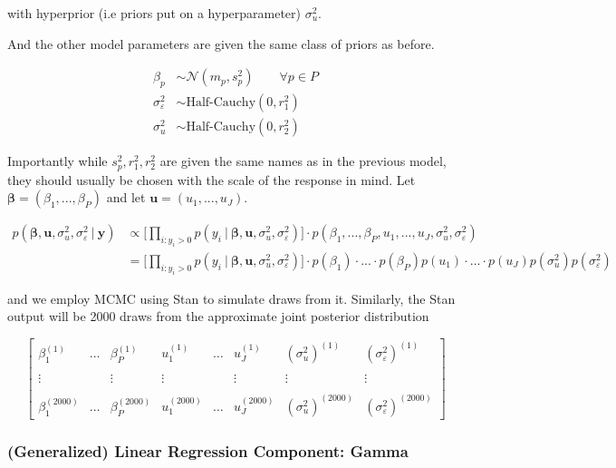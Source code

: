 \documentclass[12pt,twoside]{reedthesis}
\begin{document}
with hyperprior (i.e priors put on a hyperparameter) \(\sigma_{u}^2\).

And the other model parameters are given the same class of priors as before.

\[
\begin{aligned}
\beta_p &\sim \mathcal{N}(m_p, s_p^2)  \qquad \forall p\in P \\
\sigma_{\varepsilon}^2 &\sim \text{Half-Cauchy}(0, r_1^2) \\
\sigma_{u}^2 &\sim \text{Half-Cauchy}(0, r_2^2)
\end{aligned}
\]

Importantly while \(s_p^2, r_1^2, r_2^2\) are given the same names as in the previous model, they should usually be chosen with the scale of the response in mind. Let \(\boldsymbol{\beta} = (\beta_1, ..., \beta_P)\) and let \(\mathbf{u} = (u_1, ..., u_J)\).

\[
\begin{aligned}
p(\boldsymbol{\beta}, \boldsymbol{u}, \sigma_{u}^2, \sigma_{\varepsilon}^2 \ | \ \mathbf{y}) &\propto \bigg[\prod_{i:y_{i} > 0}p(y_{i} \ | \ \boldsymbol{\beta}, \mathbf{u}, \sigma_{u}^2, \sigma_{\varepsilon}^2)\bigg]\cdot p(\beta_1, ..., \beta_P, u_1, ..., u_J, \sigma_{u}^2, \sigma_{\varepsilon}^2) \\
 &=\bigg[\prod_{i:y_{i} > 0}p(y_{i} \ | \ \boldsymbol{\beta}, \mathbf{u},\sigma_{u}^2, \sigma_{\varepsilon}^2)\bigg]\cdot p(\beta_1)\cdot...\cdot p(\beta_P)p(u_1)\cdot ... \cdot p(u_J)p(\sigma_{u}^2)p( \sigma_{\varepsilon}^2) 
\end{aligned}
\]

and we employ MCMC using Stan to simulate draws from it. Similarly, the Stan output will be 2000 draws from the approximate joint posterior distribution

\[
\begin{bmatrix}
  \beta_1^{(1)} & \dots & \beta_P^{(1)} & u_1^{(1)} & \dots & u_J^{(1)} & (\sigma_{u}^2)^{(1)} & (\sigma_{\varepsilon}^2)^{(1)} \\
  \\ \vdots &  & \vdots & \vdots & & \vdots & \vdots & \vdots \\ \\
  \beta_1^{(2000)} & \dots & \beta_P^{(2000)} & u_1^{(2000)} & \dots & u_J^{(2000)} & (\sigma_{u}^2)^{(2000)} & (\sigma_{\varepsilon}^2)^{(2000)}
\end{bmatrix}
\]

\hypertarget{generalized-linear-regression-component-gamma}{%
\subsubsection{(Generalized) Linear Regression Component: Gamma}\label{generalized-linear-regression-component-gamma}}
\end{document}
